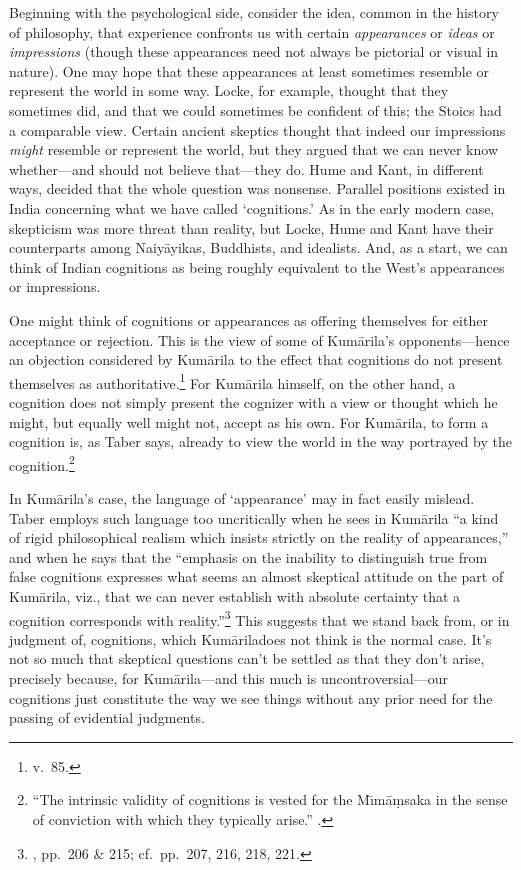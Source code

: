 \documentclass[11pt,letterpaper,oneside]{amsart}
\newcommand{\kum}{Kum\={a}rila}
\begin{document}
Beginning with the psychological side, consider the idea, common in the history of philosophy, that experience confronts us with certain \emph{appearances} or \emph{ideas} or \emph{impressions} (though these appearances need not always be pictorial or visual in nature). One may hope that these appearances at least sometimes resemble or represent the world in some way. Locke, for example, thought that they sometimes did, and that we could sometimes be confident of this; the Stoics had a comparable view. Certain ancient skeptics thought that indeed our impressions \emph{might} resemble or represent the world, but they argued that we can never know whether---and should not believe that---they do. Hume and Kant, in different ways, decided that the whole question was nonsense. Parallel positions existed in India concerning what we have called `cognitions.' As in the early modern case, skepticism was more threat than reality, but Locke, Hume and Kant have their counterparts among Naiy\=ayikas, Buddhists, and idealists. And, as a start, we can think of Indian cognitions as being roughly equivalent to the West's appearances or impressions.


One might think of cognitions or appearances as offering themselves for either acceptance or rejection. This is the view of some of Kum\=arila's opponents---hence an objection considered by Kum\=arila to the effect that cognitions do not present themselves as authoritative.\footnote{v.\ 85.} For Kum\=arila himself, on the other hand, a cognition does not simply present the cognizer with a view or thought which he might, but equally well might not, accept as his own. For \kum, to form a cognition is, as Taber says, already to view the world in the way portrayed by the cognition.\footnote{``The intrinsic validity of cognitions is vested for the M\={\i}m\=a\d msaka in the sense of conviction with which they typically arise.'' \citet[p.\ 172]{taber2002mo}.}

In \kum's case, the language of `appearance' may in fact easily mislead. Taber employs such language too uncritically when he sees in Kum\=arila ``a kind of rigid philosophical realism which insists strictly on the reality of appearances,'' and when he says that the ``emphasis on the inability to distinguish true from false cognitions expresses what seems an almost skeptical attitude on the part of \kum, viz., that we can never establish with absolute certainty that a cognition corresponds with reality.''\footnote{\citet{taber1992dkb}, pp.\ 206 \& 215; cf.\ pp.\ 207, 216, 218, 221.} This suggests that we stand back from, or in judgment of, cognitions, which \kum does not think is the normal case. It's not so much that skeptical questions can't be settled as that they don't arise, precisely because, for \kum---and this much is uncontroversial---our cognitions just constitute the way we see things without any prior need for the passing of evidential judgments.
\end{document}
